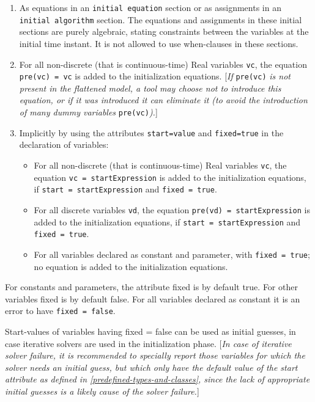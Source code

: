 \begin{enumerate}
\item
  As equations in an \lstinline!initial equation! section or as assignments in an
  \lstinline!initial algorithm! section. The equations and assignments in these
  initial sections are purely algebraic, stating constraints between the
  variables at the initial time instant. It is not allowed to use
  when-clauses in these sections.
\item
  For all non-discrete (that is continuous-time) Real variables \lstinline!vc!, the
  equation \lstinline!pre(vc) = vc! is added to the initialization
  equations. {[}\emph{If} \lstinline!pre(vc)! \emph{is not present in the
  flattened model, a tool may choose not to introduce this equation, or
  if it was introduced it can eliminate it (to avoid the introduction of
  many dummy variables} \lstinline!pre(vc)!\emph{).}{]}
\item
  Implicitly by using the attributes \lstinline!start=value! and \lstinline!fixed=true! in the
  declaration of variables:
\begin{itemize}
\item
  For all non-discrete (that is continuous-time) Real variables \lstinline!vc!, the
  equation \lstinline!vc = startExpression! is added to the initialization
  equations, if \lstinline!start = startExpression! and \lstinline!fixed = true!.
\item
  For all discrete variables \lstinline!vd!, the equation \lstinline!pre(vd) = startExpression!
  is added to the initialization equations, if \lstinline!start = startExpression!
  and \lstinline!fixed = true!.
\item
  For all variables declared as constant and parameter, with \lstinline!fixed = true!; no equation is added to the initialization equations.
\end{itemize}
\end{enumerate}

For constants and parameters, the attribute fixed is by default true.
For other variables fixed is by default false. For all variables
declared as constant it is an error to have \lstinline!fixed = false!.

Start-values of variables having fixed = false can be used as initial
guesses, in case iterative solvers are used in the initialization phase.
{[}\emph{In case of iterative solver failure, it is recommended to
specially report those variables for which the solver needs an initial
guess, but which only have the default value of the start attribute as
defined in \autoref{predefined-types-and-classes}, since the lack of appropriate initial
guesses is a likely cause of the solver failure.}{]}

